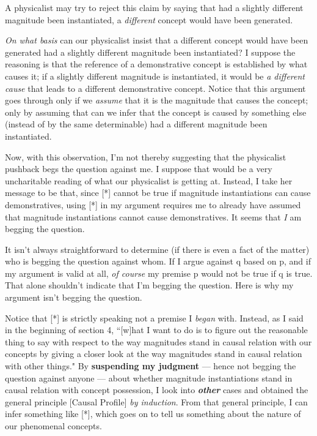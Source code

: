 \documentclass[a4paper,12pt]{article}
\begin{document}
A physicalist may try to reject this claim by saying that had a slightly different magnitude been instantiated, a \emph{different} concept would have been generated.

\emph{On what basis} can our physicalist insist that a different concept would have been generated had a slightly different magnitude been instantiated? I suppose the reasoning is that the reference of a demonstrative concept is established by what causes it; if a slightly different magnitude is instantiated, it would be \emph{a different cause} that leads to a different demonstrative concept. Notice that this argument goes through only if we \emph{assume} that it is the magnitude that causes the concept; only by assuming that can we infer that the concept is caused by something else (instead of by the same determinable) had a different magnitude been instantiated.

Now, with this observation, I'm not thereby suggesting that the physicalist pushback begs the question against me. I suppose that would be a very uncharitable reading of what our physicalist is getting at. Instead, I take her message to be that, since [*] cannot be true if magnitude instantiations can cause demonstratives, using [*] in my argument requires me to already have assumed that magnitude instantiations cannot cause demonstratives. It seems that \emph{I} am begging the question.

It isn't always straightforward to determine (if there is even a fact of the matter) who is begging the question against whom. If I argue against q based on p, and if my argument is valid at all, \emph{of course} my premise p would not be true if q is true. That alone shouldn't indicate that I'm begging the question. Here is why my argument isn't begging the question.

Notice that [*] is strictly speaking not a premise I \emph{began} with. Instead, as I said in the beginning of section 4, ``[w]hat I want to do is to figure out the reasonable thing to say with respect to the way magnitudes stand in causal relation with our concepts by giving a closer look at the way magnitudes stand in causal relation with other things." By \textbf{suspending my judgment} --- hence not begging the question against anyone --- about whether magnitude instantiations stand in causal relation with concept possession, I look into \textbf{\emph{other}} cases and obtained the general principle [Causal Profile] \emph{by induction}. From that general principle, I can infer something like [*], which goes on to tell us something about the nature of our phenomenal concepts.
\end{document}
